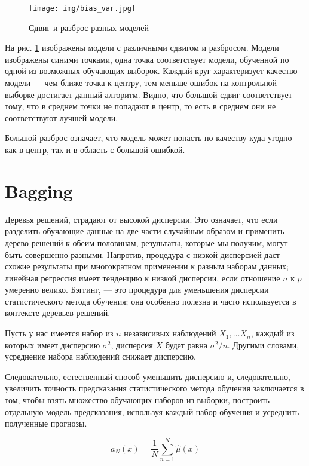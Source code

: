 \documentclass{article}
\begin{document}
\begin{figure}[!ht]
	\centering
	\texttt{[image: img/bias\_var.jpg]}
	\caption{Сдвиг и разброс разных моделей}
	\label{fig:bias_var}
\end{figure}


На рис. \ref{fig:bias_var} изображены модели с различными сдвигом и разбросом. Модели изображены синими точками, одна точка соответствует модели, обученной по одной из возможных обучающих выборок. Каждый круг характеризует качество модели --- чем ближе точка к центру, тем меньше ошибок на контрольной выборке достигает данный алгоритм. Видно, что большой сдвиг соответствует тому, что в среднем точки не попадают в центр, то есть в среднем они не соответствуют лучшей модели.

Большой разброс означает, что модель может попасть по качеству куда угодно --- как в центр, так и в область с большой ошибкой.

\section{Bagging}

Деревья решений, страдают от высокой дисперсии. Это означает, что если разделить обучающие данные на две части случайным образом и применить дерево решений к обеим половинам, результаты, которые мы получим, могут быть совершенно разными. Напротив, процедура с низкой дисперсией даст схожие результаты при многократном применении к разным наборам данных; линейная регрессия имеет тенденцию к низкой дисперсии, если отношение $n$ к $p$ умеренно велико. Бэггинг, --- это процедура для уменьшения дисперсии статистического метода обучения; она особенно полезна и часто используется в контексте деревьев решений.

Пусть у нас имеется набор из $n$ независивых наблюдений $X_1,\ldots X_n$, каждый из которых имеет дисперсию $\sigma^2$, дисперсия $\bar{X}$ будет равна $\sigma^2/n$. Другими словами, усреднение набора наблюдений снижает дисперсию.

Следовательно, естественный способ уменьшить дисперсию и, следовательно, увеличить точность предсказания статистического метода обучения заключается в том, чтобы взять множество обучающих наборов из выборки, построить отдельную модель предсказания, используя каждый набор обучения и усреднить полученные прогнозы. 

\begin{equation}
	{a}_{N}(x) = \dfrac{1}{N}\sum_{n=1}^{N}\hat{\mu}(x)
\end{equation}
\end{document}
